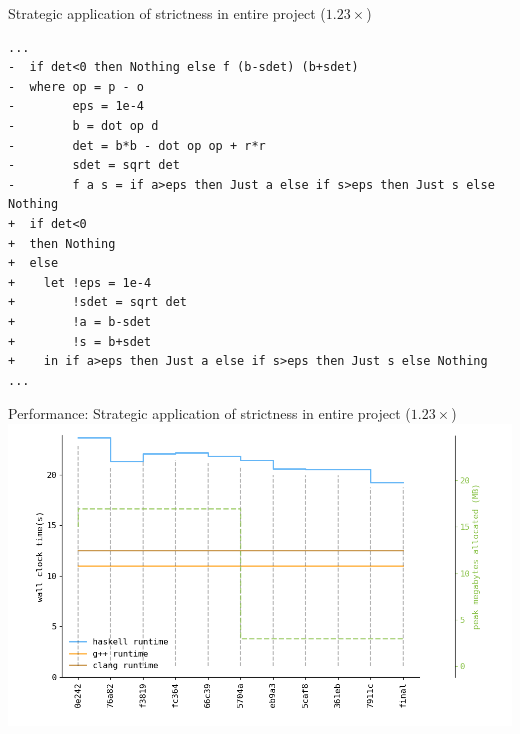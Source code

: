 \documentclass[8pt]{beamer}
\begin{document}
\begin{frame}[fragile]{Strategic application of strictness in entire project ($1.23\times$)}
\begin{verbatim}
...
-  if det<0 then Nothing else f (b-sdet) (b+sdet)
-  where op = p - o
-        eps = 1e-4
-        b = dot op d
-        det = b*b - dot op op + r*r
-        sdet = sqrt det
-        f a s = if a>eps then Just a else if s>eps then Just s else Nothing
+  if det<0
+  then Nothing
+  else
+    let !eps = 1e-4
+        !sdet = sqrt det
+        !a = b-sdet
+        !s = b+sdet
+    in if a>eps then Just a else if s>eps then Just s else Nothing
...
\end{verbatim}


\end{frame}

\begin{frame}[fragile]{Performance: Strategic application of strictness in entire project ($1.23\times$)}
\includegraphics[height=0.6\textwidth]{perfdata-upto-7911c-gen.png}
\end{frame}
\end{document}
